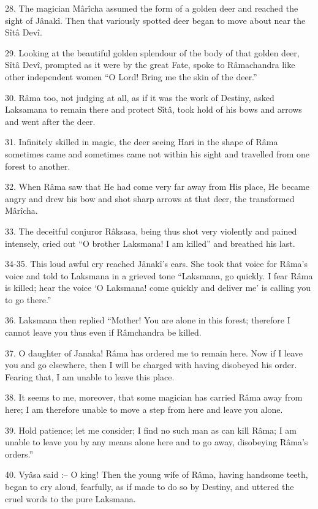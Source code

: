 28. The magician M\^ar\^icha assumed the form of a golden deer and reached the sight of J\^anak\^i. Then that variously spotted deer began to move about near the S\^it\^a Dev\^i.

29. Looking at the beautiful golden splendour of the body of that golden deer, S\^it\^a Dev\^i, prompted as it were by the great Fate, spoke to R\^amachandra like other independent women ``O Lord! Bring me the skin of the deer.''

30. R\^ama too, not judging at all, as if it was the work of Destiny, asked Laksamana to remain there and protect S\^it\^a, took hold of his bows and arrows and went after the deer.

31. Infinitely skilled in magic, the deer seeing Hari in the shape of R\^ama sometimes came and sometimes came not within his sight and travelled from one forest to another.

32. When R\^ama saw that He had come very far away from His place, He became angry and drew his bow and shot sharp arrows at that deer, the transformed M\^ar\^icha.

33. The deceitful conjuror R\^aksasa, being thus shot very violently and pained intensely, cried out ``O brother Laksmana! I am killed'' and breathed his last.

34-35. This loud awful cry reached J\^anak\^i's ears. She took that voice for R\^ama's voice and told to Laksmana in a grieved tone ``Laksmana, go quickly. I fear R\^ama is killed; hear the voice ‘O Laksmana! come quickly and deliver me' is calling you to go there.''

36. Laksmana then replied ``Mother! You are alone in this forest; therefore I cannot leave you thus even if R\^amchandra be killed.

37. O daughter of Janaka! R\^ama has ordered me to remain here. Now if I leave you and go elsewhere, then I will be charged with having disobeyed his order. Fearing that, I am unable to leave this place.

38. It seems to me, moreover, that some magician has carried R\^ama away from here; I am therefore unable to move a step from here and leave you alone.

39. Hold patience; let me consider; I find no such man as can kill R\^ama; I am unable to leave you by any means alone here and to go away, disobeying R\^ama's orders.''

40. Vy\^asa said :-- O king! Then the young wife of R\^ama, having handsome teeth, began to cry aloud, fearfully, as if made to do so by Destiny, and uttered the cruel words to the pure Laksmana.

